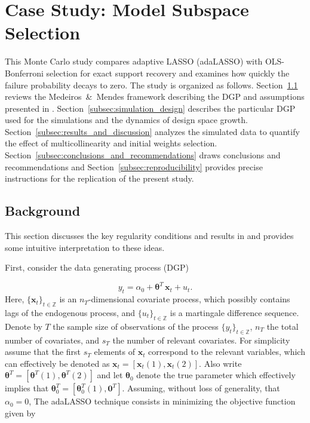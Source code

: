 \documentclass[10pt,a4paper,oneside]{article}
\newcommand{\Z}{\mathbb{Z}}
\begin{document}
\clearpage
\section{Case Study: Model Subspace Selection}
\label{ap:case_study_var_selection}

This Monte Carlo study compares adaptive LASSO (adaLASSO) \citep{Zou01122006,MEDEIROS2016255} with OLS-Bonferroni selection for exact support recovery and examines how quickly the failure probability decays to zero. The study is organized as follows. Section~\ref{subsec:background} reviews the Medeiros~\&~Mendes framework describing the DGP and assumptions presented in \cite{MEDEIROS2016255}.  Section~\ref{subsec:simulation_design} describes the particular DGP used for the simulations and the dynamics of design space growth. Section~\ref{subsec:results_and_discussion} analyzes the simulated data to quantify the effect of multicollinearity and initial weights selection. Section~\ref{subsec:conclusions_and_recommendations} draws conclusions and recommendations and Section~\ref{subsec:reproducibility} provides precise instructions for the replication of the present study.

\subsection{Background}
\label{subsec:background}

This section discusses the key regularity conditions and results in \cite{MEDEIROS2016255} and provides some intuitive interpretation to these ideas.

First, consider the data generating process (DGP) 

\begin{equation}
    y_t = \alpha_0 + \boldsymbol{\theta}^T\,\mathbf{x}_t + u_t.
    \label{eq:dgp_medmen}
\end{equation}
Here, $\{\mathbf{x}_t\}_{t \in \Z}$ is an $n_T$-dimensional covariate process, which possibly contains lags of the endogenous process, and $\{u_t\}_{t \in \Z}$ is a martingale difference sequence. Denote by $T$ the sample size of observations of the process $\{y_t \}_{t\in \Z}$, $n_T$ the total number of covariates, and $s_T$ the number of relevant covariates. For simplicity assume that the first $s_T$ elements of $\mathbf{x}_t$ correspond to the relevant variables, which can effectively be denoted as $\mathbf{x}_t = [\mathbf{x}_t(1), \mathbf{x}_t(2)]$. Also write $\boldsymbol{\theta}^T = [\boldsymbol{\theta}^T(1), \boldsymbol{\theta}^T(2)]$ and let $\boldsymbol{\theta}_0$ denote the true parameter which effectively implies that $\boldsymbol{\theta}_0^T = [\boldsymbol{\theta}_0^T(1), \mathbf{0}^T]$. Assuming, without loss of generality, that $\alpha_0 = 0$, The adaLASSO technique consists in minimizing the objective function given by
\end{document}
